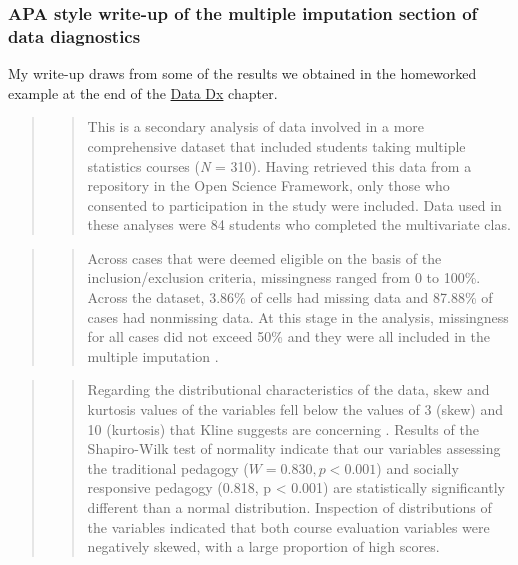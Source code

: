 \documentclass[
  11pt,
]{book}
\begin{document}
\hypertarget{apa-style-write-up-of-the-multiple-imputation-section-of-data-diagnostics}{%
\subsubsection{APA style write-up of the multiple imputation section of data diagnostics}\label{apa-style-write-up-of-the-multiple-imputation-section-of-data-diagnostics}}

My write-up draws from some of the results we obtained in the homeworked example at the end of the \protect\hyperlink{DataDx}{Data Dx} chapter.

\begin{quote}
\begin{quote}
This is a secondary analysis of data involved in a more comprehensive dataset that included students taking multiple statistics courses (\emph{N} = 310). Having retrieved this data from a repository in the Open Science Framework, only those who consented to participation in the study were included. Data used in these analyses were 84 students who completed the multivariate clas.
\end{quote}
\end{quote}

\begin{quote}
\begin{quote}
Across cases that were deemed eligible on the basis of the inclusion/exclusion criteria, missingness ranged from 0 to 100\%. Across the dataset, 3.86\% of cells had missing data and 87.88\% of cases had nonmissing data. At this stage in the analysis, missingness for all cases did not exceed 50\% \citep{katitas_getting_2019} and they were all included in the multiple imputation .
\end{quote}
\end{quote}

\begin{quote}
\begin{quote}
Regarding the distributional characteristics of the data, skew and kurtosis values of the variables fell below the values of 3 (skew) and 10 (kurtosis) that Kline suggests are concerning \citeyearpar{kline_principles_2016}. Results of the Shapiro-Wilk test of normality indicate that our variables assessing the traditional pedagogy (\(W = 0.830, p < 0.001\)) and socially responsive pedagogy (0.818, p \textless{} 0.001) are statistically significantly different than a normal distribution. Inspection of distributions of the variables indicated that both course evaluation variables were negatively skewed, with a large proportion of high scores.
\end{quote}
\end{quote}
\end{document}
